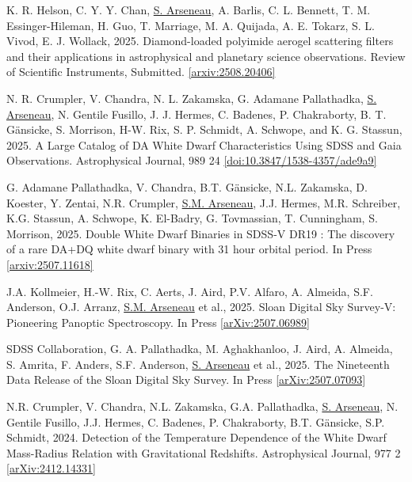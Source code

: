 \documentclass[letterpaper,11pt]{article}
\newenvironment{packed_enumerate}[1][]{
\begin{etaremune}[#1]
  \setlength{\itemsep}{3.7pt}
  \setlength{\parskip}{0pt}
  \setlength{\parsep}{0pt}}{\end{etaremune}
}
\begin{document}
\begin{packed_enumerate}

\item K. R. Helson, C. Y. Y. Chan, \underline{S. Arseneau}, A. Barlis, C. L. Bennett, T. M. Essinger-Hileman, H. Guo, T. Marriage, M. A. Quijada, A. E. Tokarz, S. L. Vivod, E. J. Wollack, 2025.  Diamond-loaded polyimide aerogel scattering filters and their applications in astrophysical and planetary science observations. Review of Scientific Instruments, Submitted. \href{https://arxiv.org/abs/2508.20406}{[arxiv:2508.20406]}

\item N. R. Crumpler, V. Chandra, N. L. Zakamska, G. Adamane Pallathadka, \underline{S. Arseneau}, N. Gentile Fusillo, J. J. Hermes, C. Badenes, P. Chakraborty, B. T. G\"ansicke, S. Morrison, H-W. Rix, S. P. Schmidt, A. Schwope, and K. G. Stassun, 2025. A Large Catalog of DA White Dwarf Characteristics Using SDSS and Gaia Observations. Astrophysical Journal, 989 24 \href{https://doi.org/10.3847/1538-4357/ade9a9}{[doi:10.3847/1538-4357/ade9a9]}

\item G. Adamane Pallathadka, V. Chandra, B.T. G\"ansicke, N.L. Zakamska, D. Koester, Y. Zentai, N.R. Crumpler, \underline{S.M. Arseneau}, J.J. Hermes, M.R. Schreiber, K.G. Stassun, A. Schwope, K. El-Badry, G. Tovmassian, T. Cunningham, S. Morrison, 2025. Double White Dwarf Binaries in SDSS-V DR19 : The discovery of a rare DA+DQ white dwarf binary with 31 hour orbital period. In Press \href{https://arxiv.org/abs/2507.11618}{[arxiv:2507.11618]}

\item  J.A. Kollmeier, H.-W. Rix, C. Aerts, J. Aird, P.V. Alfaro, A. Almeida, S.F. Anderson, O.J. Arranz, \underline{S.M. Arseneau} et al., 2025. Sloan Digital Sky Survey-V: Pioneering Panoptic Spectroscopy. In Press \href{https://https://arxiv.org/abs/2507.06989}{[arXiv:2507.06989]} 

\item  SDSS Collaboration, G. A. Pallathadka, M. Aghakhanloo, J. Aird, A. Almeida, S. Amrita, F. Anders, S.F. Anderson, \underline{S. Arseneau} et al., 2025. The Nineteenth Data Release of the Sloan Digital Sky Survey. In Press \href{https://https://arxiv.org/abs/2507.07093}{[arXiv:2507.07093]} 

\item  N.R. Crumpler, V. Chandra, N.L. Zakamska, G.A. Pallathadka, \underline{S. Arseneau}, N. Gentile Fusillo, J.J. Hermes, C. Badenes, P. Chakraborty, B.T. Gänsicke, S.P. Schmidt, 2024. Detection of the Temperature Dependence of the White Dwarf Mass-Radius Relation with Gravitational Redshifts. Astrophysical Journal, 977 2 \href{https://arxiv.org/abs/2412.14331}{[arXiv:2412.14331]} 


\end{packed_enumerate}
\end{document}
